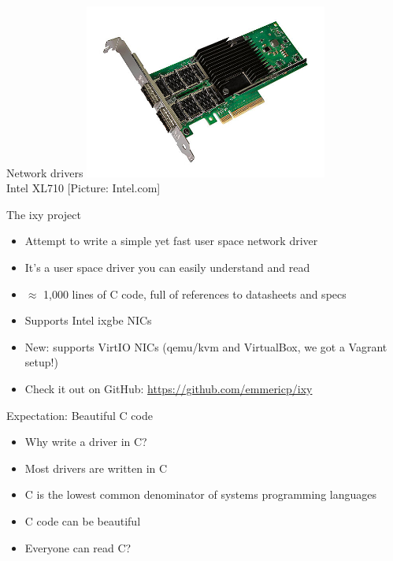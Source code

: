 \documentclass[NET,english,aspectratio=169,notitleframe]{tumbeamer}
\begin{document}
\begin{frame}{Network drivers}
\centering\includegraphics[width=0.60\textwidth]{pics/nic3}\\
\vspace{-1em}\tiny{Intel XL710 [Picture: Intel.com]}
\end{frame}

\begin{frame}{The ixy project}
\begin{itemize}
\item Attempt to write a simple yet fast user space network driver
\item It's a user space driver you can easily understand and read
\item $\approx$ 1,000 lines of C code, full of references to datasheets and specs
\item Supports Intel ixgbe NICs %
\item New: supports VirtIO NICs (qemu/kvm and VirtualBox, we got a Vagrant setup!)
\item Check it out on GitHub: \url{https://github.com/emmericp/ixy}
\end{itemize}
\end{frame}

\begin{frame}{Expectation: Beautiful C code}
\begin{itemize}
\item Why write a driver in C?
\pause
\vspace{1em}
\item Most drivers are written in C
\item C is the lowest common denominator of systems programming languages
\item C code can be beautiful
\item Everyone can read C?
\end{itemize}
\end{frame}
\end{document}
